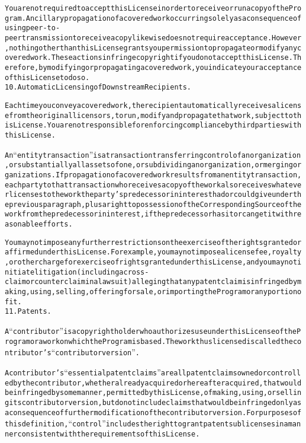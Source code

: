 \begin{alltt}
You are not required to accept this License in order to receive or run a copy of the Program. Ancillary propagation of a covered work occurring solely as a consequence of using peer-to-peer transmission to receive a copy likewise does not require acceptance. However, nothing other than this License grants you permission to propagate or modify any covered work. These actions infringe copyright if you do not accept this License. Therefore, by modifying or propagating a covered work, you indicate your acceptance of this License to do so.
10. Automatic Licensing of Downstream Recipients.

Each time you convey a covered work, the recipient automatically receives a license from the original licensors, to run, modify and propagate that work, subject to this License. You are not responsible for enforcing compliance by third parties with this License.

An “entity transaction” is a transaction transferring control of an organization, or substantially all assets of one, or subdividing an organization, or merging organizations. If propagation of a covered work results from an entity transaction, each party to that transaction who receives a copy of the work also receives whatever licenses to the work the party's predecessor in interest had or could give under the previous paragraph, plus a right to possession of the Corresponding Source of the work from the predecessor in interest, if the predecessor has it or can get it with reasonable efforts.

You may not impose any further restrictions on the exercise of the rights granted or affirmed under this License. For example, you may not impose a license fee, royalty, or other charge for exercise of rights granted under this License, and you may not initiate litigation (including a cross-claim or counterclaim in a lawsuit) alleging that any patent claim is infringed by making, using, selling, offering for sale, or importing the Program or any portion of it.
11. Patents.

A “contributor” is a copyright holder who authorizes use under this License of the Program or a work on which the Program is based. The work thus licensed is called the contributor's “contributor version”.

A contributor's “essential patent claims” are all patent claims owned or controlled by the contributor, whether already acquired or hereafter acquired, that would be infringed by some manner, permitted by this License, of making, using, or selling its contributor version, but do not include claims that would be infringed only as a consequence of further modification of the contributor version. For purposes of this definition, “control” includes the right to grant patent sublicenses in a manner consistent with the requirements of this License.


\end{alltt}
